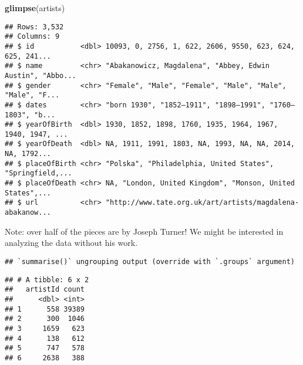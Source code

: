 \documentclass[]{article}
\newenvironment{Shaded}{\begin{snugshade}}{\end{snugshade}}
\newcommand{\DataTypeTok}[1]{\textcolor[rgb]{0.13,0.29,0.53}{#1}}
\newcommand{\DecValTok}[1]{\textcolor[rgb]{0.00,0.00,0.81}{#1}}
\newcommand{\KeywordTok}[1]{\textcolor[rgb]{0.13,0.29,0.53}{\textbf{#1}}}
\newcommand{\NormalTok}[1]{#1}
\newcommand{\OperatorTok}[1]{\textcolor[rgb]{0.81,0.36,0.00}{\textbf{#1}}}
\newcommand{\StringTok}[1]{\textcolor[rgb]{0.31,0.60,0.02}{#1}}
\begin{document}
\begin{Shaded}
\begin{Highlighting}[]
\KeywordTok{glimpse}\NormalTok{(artists)}
\end{Highlighting}
\end{Shaded}

\begin{verbatim}
## Rows: 3,532
## Columns: 9
## $ id           <dbl> 10093, 0, 2756, 1, 622, 2606, 9550, 623, 624, 625, 241...
## $ name         <chr> "Abakanowicz, Magdalena", "Abbey, Edwin Austin", "Abbo...
## $ gender       <chr> "Female", "Male", "Female", "Male", "Male", "Male", "F...
## $ dates        <chr> "born 1930", "1852–1911", "1898–1991", "1760–1803", "b...
## $ yearOfBirth  <dbl> 1930, 1852, 1898, 1760, 1935, 1964, 1967, 1940, 1947, ...
## $ yearOfDeath  <dbl> NA, 1911, 1991, 1803, NA, 1993, NA, NA, 2014, NA, 1792...
## $ placeOfBirth <chr> "Polska", "Philadelphia, United States", "Springfield,...
## $ placeOfDeath <chr> NA, "London, United Kingdom", "Monson, United States",...
## $ url          <chr> "http://www.tate.org.uk/art/artists/magdalena-abakanow...
\end{verbatim}

Note: over half of the pieces are by Joseph Turner! We might be
interested in analyzing the data without his work.

\begin{Shaded}
\end{Shaded}

\begin{verbatim}
## `summarise()` ungrouping output (override with `.groups` argument)
\end{verbatim}

\begin{verbatim}
## # A tibble: 6 x 2
##   artistId count
##      <dbl> <int>
## 1      558 39389
## 2      300  1046
## 3     1659   623
## 4      138   612
## 5      747   578
## 6     2638   388
\end{verbatim}

\begin{Shaded}
\end{Shaded}
\end{document}
